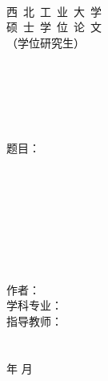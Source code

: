 \begin{titlepage}
	\sSanhao ~
	\begin{spacing}{1.5}
		\begin{center}
			\begin{center}
				\sSanhao 西~北~工~业~大~学 \\
				\sYihao 硕~士~学~位~论~文 \\
				\sSihao （学位研究生）\\
			\end{center}
			\fSong \sSihao ~ \\
			\fSong \sSihao ~ \\
			\fSong \sSihao ~ \\
			\fSong \sSihao ~ \\
			\fSong \sSihao ~ \\
			\fSong \sErhao \hspace{1em} 题目：\hspace{0.2cm} \\
			\hspace{1em} \phantom{大空格}\hspace{0.2cm} \\
			\fSong \sWuhao ~ \\
			\fSong \sWuhao ~ \\
			\fSong \sWuhao ~ \\
			\fSong \sWuhao ~ \\
			\fSong \sWuhao ~ \\
			\fSong \sWuhao ~ \\
			\fSong \sWuhao ~ \\
			\sSanhao 作\phantom{空格}者：\coverunderline[5.5cm]{\authorname} \\
			\sSanhao 学科专业： \\
			\sSanhao 指导教师： \\
			\fSong \sWuhao ~ \\
			\fSong \sWuhao ~ \\
			\fSong \sSanhao {}\fSong 年 \fSong 月
		\end{center}
	\end{spacing}
\end{titlepage}

\fSong \normalsize

\endinput
